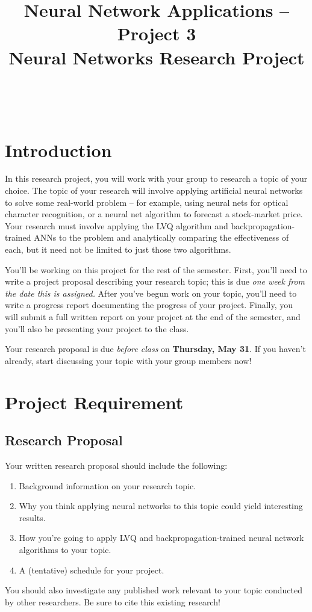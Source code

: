 \documentclass[11pt]{cselabheader}
\title{Neural Network Applications -- Project 3 \\ Neural Networks Research Project}
\begin{document}
\maketitle

\horrule{0.5pt}\\\horrule{2pt}

\section{Introduction}

In this research project, you will work with your group to research a topic of your choice. The topic of your research will involve applying artificial neural networks to solve some real-world problem -- for example, using neural nets for optical character recognition, or a neural net algorithm to forecast a stock-market price. Your research must involve applying the LVQ algorithm and backpropagation-trained ANNs to the problem and analytically comparing the effectiveness of each, but it need not be limited to just those two algorithms.

You'll be working on this project for the rest of the semester. First, you'll need to write a project proposal describing your research topic; this is due \emph{one week from the date this is assigned.} After you've begun work on your topic, you'll need to write a progress report documenting the progress of your project. Finally, you will submit a full written report on your project at the end of the semester, and you'll also be presenting your project to the class.

Your research proposal is due \emph{before class} on \textbf{Thursday, May 31}. If you haven't already, start discussing your topic with your group members now!
\pagebreak

\section{Project Requirement}

\subsection{Research Proposal}
Your written research proposal should include the following:
\begin{enumerate}
  \item Background information on your research topic.
  \item Why you think applying neural networks to this topic could yield interesting results.
  \item How you're going to apply LVQ and backpropagation-trained neural network algorithms to your topic.
  \item A (tentative) schedule for your project.
\end{enumerate}
You should also investigate any published work relevant to your topic conducted by other researchers. Be sure to cite this existing research!
\end{document}
